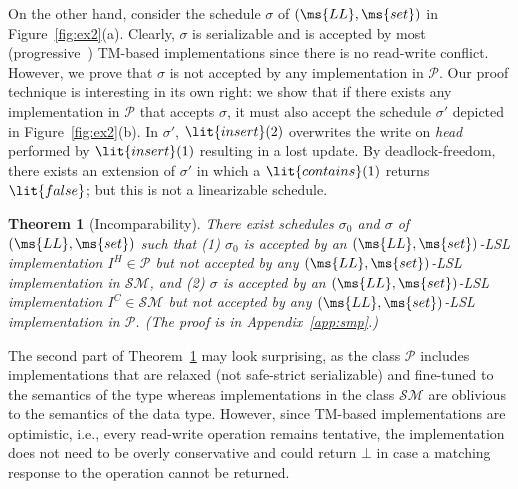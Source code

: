 \documentclass[11pt,pdftex,letterpaper]{article}
\newtheorem{theorem}{Theorem}
\newcommand{\false}{\lit{false}}
\newcommand{\LL}{\ms{LL}}
\begin{document}
On the other hand, consider the schedule $\sigma$ of $(\LL,\ms{set})$ in Figure~\ref{fig:ex2}(a).
Clearly, $\sigma$ is serializable and is accepted by most (progressive~\cite{tm-theory}) TM-based implementations since there
is no read-write conflict.
However, we prove that $\sigma$ is not accepted by any implementation in $\mathcal{P}$.
Our proof technique is interesting in its own right: we show that
if there exists any implementation in $\mathcal{P}$ that accepts $\sigma$, it must also
accept the schedule $\sigma'$ depicted in Figure~\ref{fig:ex2}(b). In $\sigma'$, 
$\lit{insert}(2)$ overwrites the write on \emph{head} performed by $\lit{insert}(1)$
resulting in a lost update. By deadlock-freedom, there exists an extension of $\sigma'$ in which
a $\lit{contains}(1)$ returns $\false$; but this is not a linearizable schedule. 
\begin{theorem}[Incomparability]
\label{th:mpl}
There exist schedules $\sigma_0$ and $\sigma$ 
of $(\LL,\ms{set})$ such that
(1) $\sigma_0$ is accepted by an $(\LL,\ms{set})$-LSL implementation $I^H \in \mathcal{P}$
but not accepted by \emph{any} $(\LL,\ms{set})$-LSL implementation in $\mathcal{SM}$, and
(2) $\sigma$ is accepted by an $(\LL,\ms{set})$-LSL implementation $I^C \in \mathcal{SM}$
but not accepted by \emph{any} $(\LL,\ms{set})$-LSL implementation in
$\mathcal{P}$.
(The proof is in Appendix~\ref{app:smp}.)
\end{theorem}
The second part of
Theorem~\ref{th:mpl} 
may look surprising, as 
the class $\mathcal{P}$ includes implementations that are relaxed (not safe-strict serializable) and 
fine-tuned to the semantics of the type whereas implementations in the class $\mathcal{SM}$ are oblivious to the semantics of the data type.
However, since TM-based implementations are optimistic, i.e., every read-write operation remains tentative, 
the implementation does not need to be overly conservative and could return $\bot$ in case a matching response to the 
operation cannot be returned.
\end{document}
